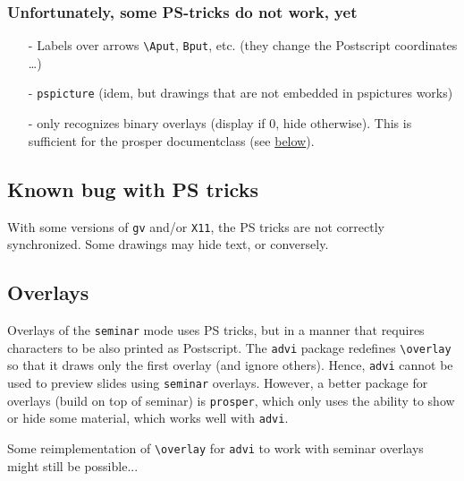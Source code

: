 \documentclass[12pt]{article}
\begin{document}
\subsubsection* {Unfortunately, some PS-tricks do not work, yet}

\begin{itemize}
\item[-] Labels over arrows \verb"\Aput", \verb"Bput", etc.
(they change the Postscript coordinates \ldots)

\item[-] {\tt pspicture} (idem, but drawings that are not embedded in
pspictures works)

\item[-] {\ActiveDVI} only recognizes binary overlays (display if 0,
hide otherwise). This is sufficient for the prosper documentclass (see
\hyperlink {overlays}{below}).

\end {itemize}



\subsection*{Known bug with PS tricks}

With some versions of \verb"gv" and/or \verb"X11", the PS tricks are not
correctly synchronized. Some drawings may hide text, or conversely.



\newpage

\subsection* {Overlays}
\hypertarget {overlays}{}

Overlays of the \verb"seminar" mode uses PS tricks, but in a manner that
requires characters to be also printed as Postscript. The \verb"advi" package 
redefines \verb"\overlay" so that it draws only the first overlay (and
ignore others).
Hence, \verb"advi" cannot be used to preview slides using \verb"seminar"
overlays. However, a better package for overlays (build on top of seminar)
is \verb"prosper", which only uses the ability to show or hide some
material, which works well with \verb"advi".

Some reimplementation of \verb"\overlay" for \verb"advi" to work with 
seminar overlays might still be possible...  
\end{document}
